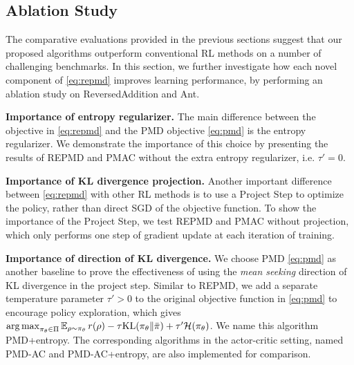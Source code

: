 
\subsection{Ablation Study}
\label{subsec:ablationstudy}

The comparative evaluations provided in the previous sections suggest 
that our proposed algorithms 
outperform conventional RL methods on a number of challenging benchmarks.
In this section, we further investigate how each novel component of
\cref{eq:repmd} improves learning performance,
by performing an ablation study on ReversedAddition and Ant.


\textbf{Importance of entropy regularizer.}
The main difference between the objective in \cref{eq:repmd} and the PMD
objective \cref{eq:pmd} is the entropy regularizer.
We demonstrate the importance of this choice by presenting the results of REPMD and PMAC without the extra entropy regularizer, i.e. $\tau'=0$.

\textbf{Importance of KL divergence projection.}
Another important difference between \cref{eq:repmd} with other RL methods
is to use a Project Step to optimize the policy,
rather than direct SGD of the objective function.
To show the importance of the Project Step,
we test REPMD and PMAC without projection,
which only performs one step of gradient update at each iteration of training. 

\textbf{Importance of direction of KL divergence.}
We choose PMD \cref{eq:pmd} as another baseline
to prove the effectiveness of using the \emph{mean seeking}
direction of KL divergence in the project step.
Similar to REPMD, we add a separate temperature parameter $\tau' > 0$
to the original objective function in \cref{eq:pmd}
to encourage policy exploration,
which gives
$\operatorname*{arg\,max}_{\pi_\theta \in \Pi}{ \operatorname*{\mathbb{E}}_{\rho \sim \pi_\theta}{  r(\rho)  - \tau \text{KL}(\pi_\theta \| \bar{\pi}) } + \tau'\mathcal{H}(\pi_\theta) }$.
We name this algorithm PMD+entropy.
The corresponding algorithms in the actor-critic setting,
named PMD-AC and PMD-AC+entropy, are also implemented for comparison.

